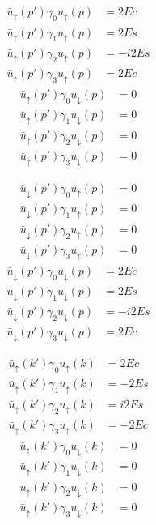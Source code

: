 \begin{minipage}[t]{0.48\textwidth}
\begin{align*}
    \bar{u}_\uparrow (p') \gamma_0 {u}_\uparrow (p) & = 2Ec \\
    \bar{u}_\uparrow (p') \gamma_1 {u}_\uparrow (p) & = 2Es \\
    \bar{u}_\uparrow (p') \gamma_2 {u}_\uparrow (p) & = -i2Es \\
    \bar{u}_\uparrow (p') \gamma_3 {u}_\uparrow (p) & = 2Ec
\end{align*}
\begin{align*}
    \bar{u}_\uparrow(p') \gamma_0 {u}_\downarrow (p) & = 0 \\
    \bar{u}_\uparrow(p') \gamma_1 {u}_\downarrow (p) & = 0 \\
    \bar{u}_\uparrow(p') \gamma_2 {u}_\downarrow (p) & = 0 \\
    \bar{u}_\uparrow(p') \gamma_3 {u}_\downarrow (p) & = 0
\end{align*}
\end{minipage}\hfill
\begin{minipage}[t]{0.48\textwidth}
\begin{align*}
    \bar{u}_\downarrow (p') \gamma_0 {u}_\uparrow (p) & = 0 \\
    \bar{u}_\downarrow (p') \gamma_1 {u}_\uparrow (p) & = 0 \\
    \bar{u}_\downarrow (p') \gamma_2 {u}_\uparrow (p) & = 0 \\
    \bar{u}_\downarrow (p') \gamma_3 {u}_\uparrow (p) & = 0
\end{align*}
\begin{align*}
    \bar{u}_\downarrow(p') \gamma_0 {u}_\downarrow (p) & = 2Ec \\
    \bar{u}_\downarrow(p') \gamma_1 {u}_\downarrow (p) & = 2Es \\
    \bar{u}_\downarrow(p') \gamma_2 {u}_\downarrow (p) & = -i2Es \\
    \bar{u}_\downarrow(p') \gamma_3 {u}_\downarrow (p) & = 2Ec
\end{align*}
\end{minipage}
\begin{minipage}[t]{0.48\textwidth}
\begin{align*}
    \bar{u}_\uparrow (k') \gamma_0 {u}_\uparrow (k) & = 2Ec \\
    \bar{u}_\uparrow (k') \gamma_1 {u}_\uparrow (k) & = -2Es \\
    \bar{u}_\uparrow (k') \gamma_2 {u}_\uparrow (k) & = i2Es \\
    \bar{u}_\uparrow (k') \gamma_3 {u}_\uparrow (k) & = -2Ec
\end{align*}
\begin{align*}
    \bar{u}_\uparrow(k') \gamma_0 {u}_\downarrow (k) & = 0 \\
    \bar{u}_\uparrow(k') \gamma_1 {u}_\downarrow (k) & = 0 \\
    \bar{u}_\uparrow(k') \gamma_2 {u}_\downarrow (k) & = 0 \\
    \bar{u}_\uparrow(k') \gamma_3 {u}_\downarrow (k) & = 0
\end{align*}
\end{minipage}\hfill

